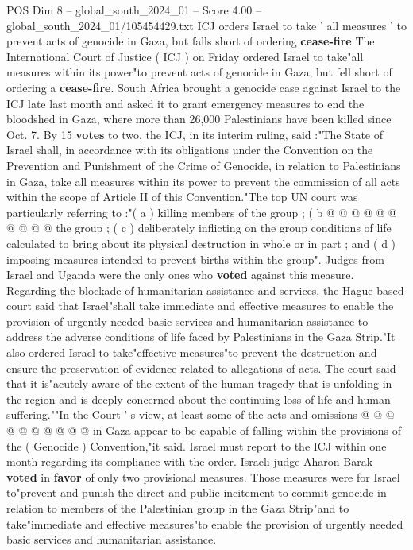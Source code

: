 \begin{textsample}{POS Dim 8 – global\_south\_2024\_01 – Score 4.00 – global\_south\_2024\_01/105454429.txt}  \label{ex:f8_pos_283}
ICJ orders Israel to take ' all measures ' to prevent acts of genocide in Gaza, but falls short of ordering \textbf{cease-fire} The International Court of Justice ( ICJ ) on Friday ordered Israel to take"all measures within its power"to prevent acts of genocide in Gaza, but fell short of ordering a \textbf{cease-fire}.
South Africa brought a genocide case against Israel to the ICJ late last month and asked it to grant emergency measures to end the bloodshed in Gaza, where more than 26,000 Palestinians have been killed since Oct. 7.
By 15 \textbf{votes} to two, the ICJ, in its interim ruling, said :"The State of Israel shall, in accordance with its obligations under the Convention on the Prevention and Punishment of the Crime of Genocide, in relation to Palestinians in Gaza, take all measures within its power to prevent the commission of all acts within the scope of Article II of this Convention."The top UN court was particularly referring to :"( a ) killing members of the group ; ( b @ @ @ @ @ @ @ @ @ @ the group ; ( c ) deliberately inflicting on the group conditions of life calculated to bring about its physical destruction in whole or in part ; and ( d ) imposing measures intended to prevent births within the group".
Judges from Israel and Uganda were the only ones who \textbf{voted} against this measure.
Regarding the blockade of humanitarian assistance and services, the Hague-based court said that Israel"shall take immediate and effective measures to enable the provision of urgently needed basic services and humanitarian assistance to address the adverse conditions of life faced by Palestinians in the Gaza Strip."It also ordered Israel to take"effective measures"to prevent the destruction and ensure the preservation of evidence related to allegations of acts.
The court said that it is"acutely aware of the extent of the human tragedy that is unfolding in the region and is deeply concerned about the continuing loss of life and human suffering.""In the Court ' s view, at least some of the acts and omissions @ @ @ @ @ @ @ @ @ @ in Gaza appear to be capable of falling within the provisions of the ( Genocide ) Convention,"it said.
Israel must report to the ICJ within one month regarding its compliance with the order.
Israeli judge Aharon Barak \textbf{voted} in \textbf{favor} of only two provisional measures.
Those measures were for Israel to"prevent and punish the direct and public incitement to commit genocide in relation to members of the Palestinian group in the Gaza Strip"and to take"immediate and effective measures"to enable the provision of urgently needed basic services and humanitarian assistance.

\end{textsample}
